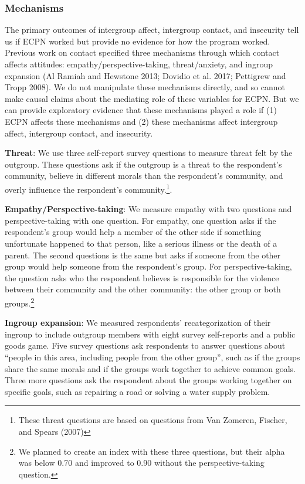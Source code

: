 \documentclass[11pt]{article}
\begin{document}
\hypertarget{mechanisms}{%
\subsubsection{Mechanisms}\label{mechanisms}}

The primary outcomes of intergroup affect, intergroup contact, and
insecurity tell us if ECPN worked but provide no evidence for how the
program worked. Previous work on contact specified three mechanisms
through which contact affects attitudes: empathy/perspective-taking,
threat/anxiety, and ingroup expansion (Al Ramiah and Hewstone 2013;
Dovidio et al. 2017; Pettigrew and Tropp 2008). We do not manipulate
these mechanisms directly, and so cannot make causal claims about the
mediating role of these variables for ECPN. But we can provide
exploratory evidence that these mechanisms played a role if (1) ECPN
affects these mechanisms and (2) these mechanisms affect intergroup
affect, intergroup contact, and insecurity.

\textbf{Threat}: We use three self-report survey questions to measure
threat felt by the outgroup. These questions ask if the outgroup is a
threat to the respondent's community, believe in different morals than
the respondent's community, and overly influence the respondent's
community.\footnote{These threat questions are based on questions from
  Van Zomeren, Fischer, and Spears (2007)}.

\textbf{Empathy/Perspective-taking}: We measure empathy with two
questions and perspective-taking with one question. For empathy, one
question asks if the respondent's group would help a member of the other
side if something unfortunate happened to that person, like a serious
illness or the death of a parent. The second questions is the same but
asks if someone from the other group would help someone from the
respondent's group. For perspective-taking, the question asks who the
respondent believes is responsible for the violence between their
community and the other community: the other group or both
groups.\footnote{We planned to create an index with these three
  questions, but their alpha was below 0.70 and improved to 0.90 without
  the perspective-taking question.}

\textbf{Ingroup expansion}: We measured respondents' recategorization of
their ingroup to include outgroup members with eight survey self-reports
and a public goods game. Five survey questions ask respondents to answer
questions about ``people in this area, including people from the other
group'', such as if the groups share the same morals and if the groups
work together to achieve common goals. Three more questions ask the
respondent about the groups working together on specific goals, such as
repairing a road or solving a water supply problem.
\end{document}
